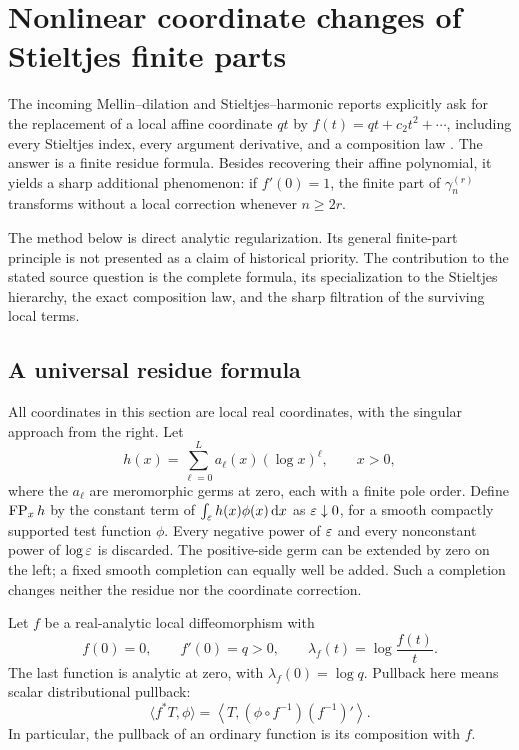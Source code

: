 \section{Nonlinear coordinate changes of Stieltjes finite parts}
\label{nc:section}

The incoming Mellin--dilation and Stieltjes--harmonic reports explicitly
ask for the replacement of a local affine coordinate $qt$ by
$f(t)=qt+c_2t^2+\cdots$, including every Stieltjes index, every argument
derivative, and a composition law \cite{incoming-md,incoming-sh}.
The answer is a finite residue formula. Besides recovering their affine
polynomial, it yields a sharp additional phenomenon: if $f'(0)=1$, the
finite part of $\gamma_n^{(r)}$ transforms without a local correction
whenever $n\geq2r$.

The method below is direct analytic regularization. Its general
finite-part principle is not presented as a claim of historical priority.
The contribution to the stated source question is the complete formula,
its specialization to the Stieltjes hierarchy, the exact composition law,
and the sharp filtration of the surviving local terms.

\subsection{A universal residue formula}

All coordinates in this section are local real coordinates, with the
singular approach from the right. Let
\begin{equation}\label{nc:loggerm}
 h(x)=\sum_{\ell=0}^{L}a_\ell(x)(\log x)^\ell,\qquad x>0,
\end{equation}
where the $a_\ell$ are meromorphic germs at zero, each with a finite pole
order. Define $\operatorname{FP}_xh$ by the constant term of
$\int_\varepsilon h(x)\phi(x)\,\mathrm d x$ as $\varepsilon\downarrow0$, for a smooth
compactly supported test function $\phi$. Every negative power of
$\varepsilon$ and every nonconstant power of $\log\varepsilon$ is discarded.
The positive-side germ can be extended by zero on the left; a fixed
smooth completion can equally well be added. Such a completion changes
neither the residue nor the coordinate correction.

Let $f$ be a real-analytic local diffeomorphism with
\begin{equation}\label{nc:coordinate}
 f(0)=0,\qquad f'(0)=q>0,
 \qquad \lambda_f(t)=\log\frac{f(t)}t.
\end{equation}
The last function is analytic at zero, with
$\lambda_f(0)=\log q$. Pullback here means scalar distributional
pullback:
\begin{equation}\label{nc:pullback}
 \langle f^*T,\phi\rangle
 =\left\langle T,
       (\phi\circ f^{-1})(f^{-1})'\right\rangle.
\end{equation}
In particular, the pullback of an ordinary function is its composition
with $f$.

